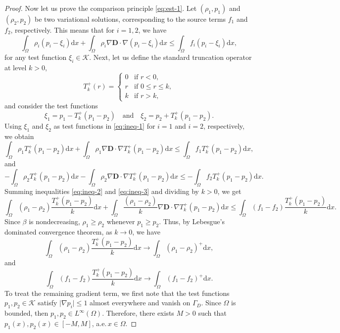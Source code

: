 \documentclass[final,reqno]{amsart}
\theoremstyle{plain}
\theoremstyle{definition}
\theoremstyle{remark}
\numberwithin{remark}{section}	%
\numberwithin{example}{section}	%
\newcommand{\de}{\mathbf{D}}
\newcommand{\K}{\mathcal K}
\newcommand{\Om}{\Omega}
\newcommand{\pp}{a.e.\,}
\newcommand{\dd}{\mathrm{d}}
\begin{document}
\begin{proof}
    Now let us prove the comparison principle \eqref{eq:est-1}. Let $(\rho_1, p_1)$ and $(\rho_2, p_2)$ be two variational solutions, corresponding to the source terms $f_1$ and $f_2$, respectively. This means that for $i=1,2$, we have
    \begin{equation}
        \label{eq:ineq-1}
        \int_{\Om}\rho_i (p_i-\xi_i) \dd x + \int_{\Omega} \rho_i\nabla\de\cdot\nabla(p_i-\xi_i)\dd x \leq \int_{\Om} f_i(p_i-\xi_i)\dd x,
    \end{equation}
    for any test function $\xi_i\in\K$. Next, let us define the standard truncation operator at level $k>0$,
    \begin{equation}
        T_{k}^{+}(r) = 
        \begin{cases}
            0 & \text{if } r < 0,\\
            r & \text{if } 0 \leq r \leq k,\\
            k & \text{if } r > k,
        \end{cases}
    \end{equation}
    and consider the test functions
    \[
        \xi_{1} = p_1 - T_{k}^{+}(p_1 - p_2) \quad \text{and} \quad \xi_{2} = p_2 + T_{k}^{+}(p_1-p_2).
    \]
    Using $\xi_1$ and $\xi_2$ as test functions in \eqref{eq:ineq-1} for $i=1$ and $i=2$, respectively, we obtain  
       \begin{equation}
        \label{eq:ineq-2}
        \int_{\Om}\rho_1 T_{k}^{+}(p_1-p_2) \dd x + \int_{\Omega} \rho_1\nabla\de\cdot\nabla T_{k}^{+}(p_1-p_2)\dd x \leq \int_{\Om} f_1 T_{k}^{+}(p_1-p_2)\dd x,
    \end{equation}
    and
    \begin{equation}
        \label{eq:ineq-3}
        -\int_{\Om}\rho_2 T_{k}^{+}(p_1-p_2) \dd x - \int_{\Omega} \rho_2\nabla\de\cdot\nabla T_{k}^{+}(p_1-p_2)\dd x \leq -\int_{\Om} f_2 T_{k}^{+}(p_1-p_2)\dd x.
    \end{equation}
    Summing inequalities \eqref{eq:ineq-2} and \eqref{eq:ineq-3} and dividing by $k>0$, we get	
    \begin{equation}
        \label{eq:ineq-4}
        \int_{\Om}(\rho_1-\rho_2) \frac{T_{k}^{+}(p_1-p_2)}{k} \dd x + \int_{\Omega} \frac{(\rho_1 - \rho_2)}{k}\nabla\de\cdot\nabla T_{k}^{+}(p_1-p_2)\dd x \leq \int_{\Om} (f_1-f_2)\frac{ T_{k}^{+}(p_1-p_2)}{k}\dd x.
    \end{equation}
    Since $\beta$ is nondecreasing, $\rho_1 \geq \rho_2$ whenever $p_1 \geq p_2$. Thus, by Lebesgue's dominated convergence theorem, as $k \to 0$, we have
    \[
        \int_{\Om}(\rho_1-\rho_2) \frac{T_{k}^{+}(p_1-p_2)}{k} \dd x \longrightarrow \int_{\Om}(\rho_1-\rho_2)^{+}\dd x,
    \]
    and 
    \[
        \int_{\Om} (f_1-f_2)\frac{ T_{k}^{+}(p_1-p_2)}{k}\dd x \longrightarrow   \int_{\Om} (f_1-f_2)^{+}\dd x.
    \]
To treat the remaining gradient term, we first note that the test functions $p_1, p_2 \in \K$ satisfy $\vert \nabla p_i \vert \leq 1$ almost everywhere and vanish on $\Gamma_D$. Since $\Omega$ is bounded, then $p_1,p_2\in L^\infty(\Omega)$. Therefore, there exists $M > 0$ such that $p_1(x), p_2(x) \in [-M, M]$, \pp $x \in \Omega$.


\end{proof}
\end{document}
